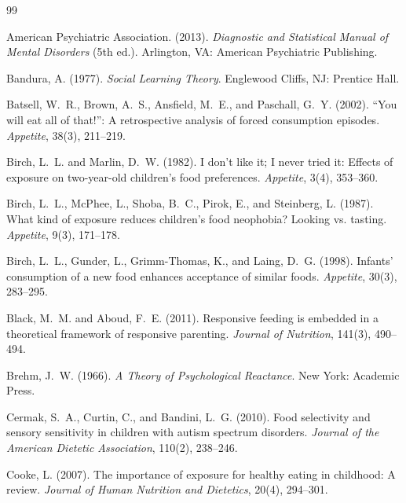\documentclass[11pt]{article}
\theoremstyle{remark}
\begin{document}
\begin{thebibliography}{99}
\setlength{\itemsep}{0.2em}

American Psychiatric Association. (2013).
\newblock \emph{Diagnostic and Statistical Manual of Mental Disorders} (5th ed.).
\newblock Arlington, VA: American Psychiatric Publishing.

Bandura, A. (1977).
\newblock \emph{Social Learning Theory}.
\newblock Englewood Cliffs, NJ: Prentice Hall.

Batsell, W.~R., Brown, A.~S., Ansfield, M.~E., and Paschall, G.~Y. (2002).
\newblock ``You will eat all of that!'': A retrospective analysis of forced consumption episodes.
\newblock \emph{Appetite}, 38(3), 211--219.

Birch, L.~L. and Marlin, D.~W. (1982).
\newblock I don't like it; I never tried it: Effects of exposure on two-year-old children's food preferences.
\newblock \emph{Appetite}, 3(4), 353--360.

Birch, L.~L., McPhee, L., Shoba, B.~C., Pirok, E., and Steinberg, L. (1987).
\newblock What kind of exposure reduces children's food neophobia? Looking vs. tasting.
\newblock \emph{Appetite}, 9(3), 171--178.

Birch, L.~L., Gunder, L., Grimm-Thomas, K., and Laing, D.~G. (1998).
\newblock Infants' consumption of a new food enhances acceptance of similar foods.
\newblock \emph{Appetite}, 30(3), 283--295.

Black, M.~M. and Aboud, F.~E. (2011).
\newblock Responsive feeding is embedded in a theoretical framework of responsive parenting.
\newblock \emph{Journal of Nutrition}, 141(3), 490--494.

Brehm, J.~W. (1966).
\newblock \emph{A Theory of Psychological Reactance}.
\newblock New York: Academic Press.

Cermak, S.~A., Curtin, C., and Bandini, L.~G. (2010).
\newblock Food selectivity and sensory sensitivity in children with autism spectrum disorders.
\newblock \emph{Journal of the American Dietetic Association}, 110(2), 238--246.

Cooke, L. (2007).
\newblock The importance of exposure for healthy eating in childhood: A review.
\newblock \emph{Journal of Human Nutrition and Dietetics}, 20(4), 294--301.


\end{thebibliography}
\end{document}
